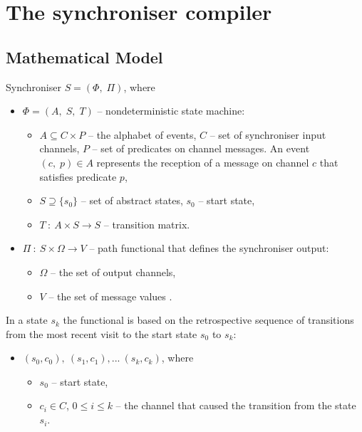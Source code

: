 \chapter{The synchroniser compiler}
  \section{Mathematical Model}
Synchroniser $S = (\Phi, \; \Pi)$, where
  \begin{itemize}
  \item[] $\Phi = (A, \; S, \; T)$ -- nondeterministic state machine:
    \begin{itemize}
    \item[] $A \subseteq C \times P$ -- the alphabet of events, $C$ -- set of synchroniser input channels, $P$ -- set of predicates on channel messages. An event $(c, \; p) \in A$ represents the reception of a message on channel $c$ that satisfies predicate $p$,
    \item[] $S \supseteq \{s_{0}\}$ -- set of abstract states, $s_{0}$ -- start state,
    \item[] $T \: : \: A \times S \to S$ -- transition matrix.
    \end{itemize}
  \item[] $\Pi \: : \: S \times \Omega \to V$ -- path functional that defines the synchroniser output:
    \begin{itemize}
    \item[] $\Omega$ -- the set of output channels,
    \item[] $V$ -- the set of message values \cite{astrakahn}.
    \end{itemize}
  \end{itemize}

In a state $s_{k}$ the functional is based on the retrospective sequence of transitions from the most recent visit to the start state $s_{0}$ to $s_{k}$:
  \begin{itemize}
  \item[] $(s_{0}, c_{0}), \: (s_{1}, c_{1}),... \: (s_{k}, c_{k})$, where
    \begin{itemize}
      \item[] $s_{0}$ -- start state,
      \item[] $c_{i} \in C$, $0 \le i \le k$ -- the channel that caused the transition from the state $s_{i}$.
    \end{itemize}
  \end{itemize}

